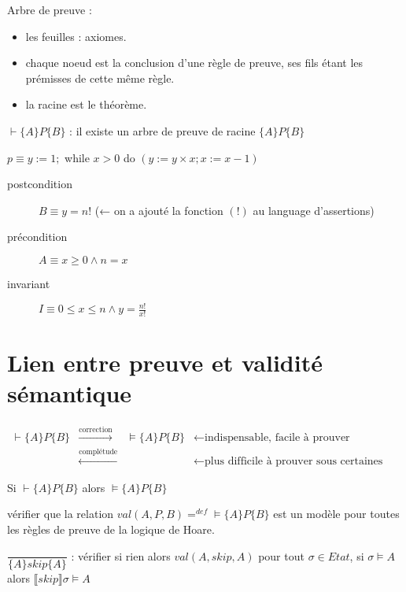 \documentclass[10pt,a4paper]{article}
\newcommand{\semm}[1]{\llbracket #1 \rrbracket }
\newcommand{\semh}[3]{\{#1\}#2\{#3\}}
\begin{document}
Arbre de preuve : \begin{itemize}
                   \item les feuilles : axiomes.
                   \item chaque noeud est la conclusion d'une règle de preuve, ses fils étant les prémisses de cette même règle.
                   \item la racine est le théorème.
                  \end{itemize}

$\vdash \semh{A}{P}{B}$ : il existe un arbre de preuve de racine $\semh{A}{P}{B}$

\begin{ex}
$ p \equiv y := 1;$ while $x > 0$ do $(y := y \times x; x := x-1)$

\begin{description}
 \item [postcondition] $B \equiv y = n!$  \quad  (← on a ajouté la fonction $(!)$ au language d'assertions)
 \item[précondition] $A \equiv x \geq 0 \wedge n = x$
 \item[invariant] $I \equiv 0 \leq x \leq n \wedge y = \frac{n!}{x!}$
\end{description}
\end{ex}


\section{Lien entre preuve et validité sémantique}

$\begin{array}{lcrr}
\vdash \semh{A}{P}{B} & \xrightarrow{\text{correction}}& \models \semh{A}{P}{B} &  ← \text{indispensable, facile à prouver}\\
                       & \xleftarrow{\text{complétude}} & & ← \text{plus difficile à prouver sous certaines hypothèses}
\end{array}$

\begin{thm}
 Si $\vdash \semh{A}{P}{B}$ alors $\models \semh{A}{P}{B}$
\end{thm}
\begin{dem}
 vérifier que la relation $val(A,P,B) =^{def} \models \semh{A}{P}{B}$ est un modèle pour toutes les règles de preuve de la logique de Hoare.
\end{dem}

$\dfrac{}{\semh{A}{skip}{A}}$ : vérifier \og si \og rien \fg alors $val(A, skip, A)$
			      pour tout $\sigma \in Etat$, si $\sigma \models A$ alors $\semm{skip} \sigma \models A$
\end{document}
